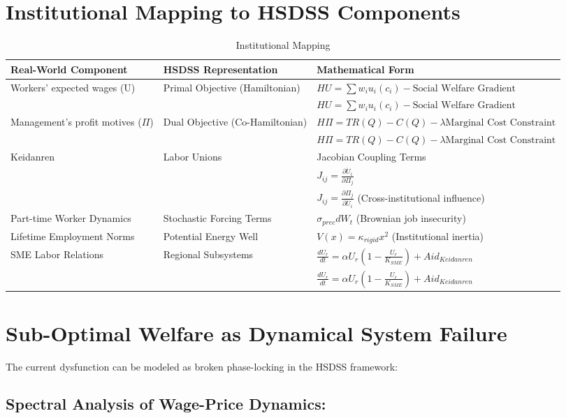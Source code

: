\documentclass[10pt]{article}
\theoremstyle{definition}
\begin{document}
\section{Institutional Mapping to HSDSS Components}
\begin{table}[htbp]
\centering
\begin{tabular}{p{3cm}p{3cm}p{6cm}}
\hline
\textbf{Real-World Component} & \textbf{HSDSS Representation} & \textbf{Mathematical Form} \\ \hline
Workers' expected wages (U) & Primal Objective (Hamiltonian) & $HU = \sum w_i u_i(c_i) - \text{Social Welfare Gradient}$ \\
 & & $HU = \sum w_i u_i(c_i) - \text{Social Welfare Gradient}$ \\ \hline
Management's profit motives ($\Pi$) & Dual Objective (Co-Hamiltonian) & $H\Pi = TR(Q) - C(Q) - \lambda \text{Marginal Cost Constraint}$ \\ \hline
 & & $H\Pi = TR(Q) - C(Q) - \lambda \text{Marginal Cost Constraint}$ \\ 
Keidanren & Labor Unions & Jacobian Coupling Terms \\
 & & $J_{ij} = \frac{\partial \dot{U}_i}{\partial \Pi_j}$ \\
 & & $J_{ij} = \frac{\partial \Pi_j}{\partial \dot{U}_i}$ (Cross-institutional influence) \\\hline
Part-time Worker Dynamics & Stochastic Forcing Terms & $\sigma_{prec} dW_t$ (Brownian job insecurity) \\ \hline
Lifetime Employment Norms & Potential Energy Well & $V(x) = \kappa_{rigid} x^2$ (Institutional inertia) \\ 
SME Labor Relations & Regional Subsystems & $\frac{dU_r}{dt} = \alpha U_r (1 - \frac{U_r}{K_{SME}}) + Aid_{Keidanren}$ \\
 & & $\frac{dU_r}{dt} = \alpha U_r (1 - \frac{U_r}{K_{SME}}) + Aid_{Keidanren}$ \\ \hline
\end{tabular}
\caption{Institutional Mapping}
\label{tab:dissertation_format}
\end{table}

\section{Sub-Optimal Welfare as Dynamical System Failure}
The current dysfunction can be modeled as broken phase-locking in the HSDSS framework:

\subsection{Spectral Analysis of Wage-Price Dynamics:}
\end{document}
